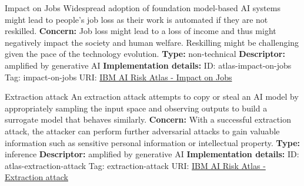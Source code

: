 \documentclass[a4paper,12pt]{article}
\begin{document}
\begin{definitionbox}{Impact on Jobs}
Widespread adoption of foundation model-based AI systems might lead to people's job loss as their work is automated if they are not reskilled.\newline\newline
\textbf{Concern: }Job loss might lead to a loss of income and thus might negatively impact the society and human welfare. Reskilling might be challenging given the pace of the technology evolution.\newline\newline
\textbf{Type: }non-technical\newline
\textbf{Descriptor: }amplified by generative AI \newline\newline
\textbf{Implementation details: } \newline
ID: atlas-impact-on-jobs \newline
Tag: impact-on-jobs \newline
URI:  \href{https://www.ibm.com/docs/en/watsonx/saas?topic=SSYOK8/wsj/ai-risk-atlas/impact-on-jobs.html}{IBM AI Risk Atlas - Impact on Jobs}\newline
\end{definitionbox}
\begin{definitionbox}{Extraction attack}
An extraction attack attempts to copy or steal an AI model by appropriately sampling the input space and observing outputs to build a surrogate model that behaves similarly.\newline\newline
\textbf{Concern: }With a successful extraction attack, the attacker can perform further adversarial attacks to gain valuable information such as sensitive personal information or intellectual property.\newline\newline
\textbf{Type: }inference\newline
\textbf{Descriptor: }amplified by generative AI \newline\newline
\textbf{Implementation details: } \newline
ID: atlas-extraction-attack \newline
Tag: extraction-attack \newline
URI:  \href{https://www.ibm.com/docs/en/watsonx/saas?topic=SSYOK8/wsj/ai-risk-atlas/extraction-attack.html}{IBM AI Risk Atlas - Extraction attack}\newline
\end{definitionbox}
\end{document}
